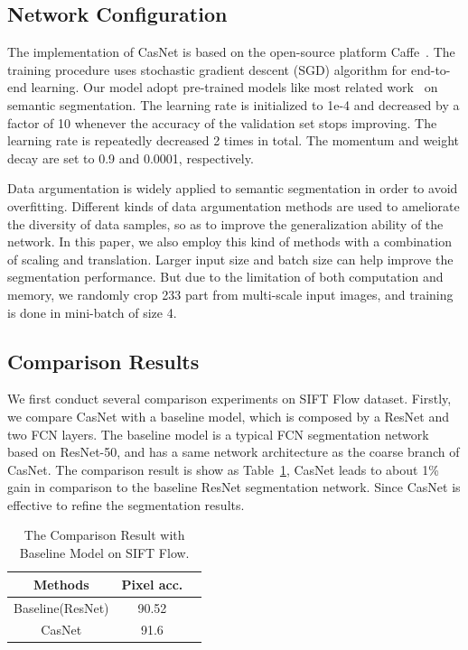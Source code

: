 \documentclass[10.5pt,compsoc]{TsT}
\newcommand{\upcite}[1]{\superscript{\textsuperscript{\cite{#1}}}}
\theoremstyle{mystyle}
\newcommand{\upcite}[1]{\textsuperscript{\cite{#1}}}
\begin{document}
{\subsection{Network Configuration}
\noindent
The implementation of CasNet is based on the open-source platform Caffe~\upcite{23}. The training procedure uses stochastic gradient descent (SGD) algorithm for end-to-end learning. Our model adopt pre-trained models like most related work~\cite{21} on semantic segmentation. The learning rate is initialized to 1e-4 and decreased by a factor of 10 whenever the accuracy of the validation set stops improving. The learning rate is repeatedly decreased 2 times in total. The momentum and weight decay are set to 0.9 and 0.0001, respectively.

Data argumentation is widely applied to semantic segmentation in order to avoid overfitting.
Different kinds of data argumentation methods are used to ameliorate the diversity of data samples, so as to improve the generalization ability of the network.
In this paper, we also employ this kind of methods with a combination of scaling and translation. 
Larger input size and batch size can help improve the segmentation performance. But due to the limitation of both computation and memory, we randomly crop 233 part from multi-scale input images, and training is done in mini-batch of size 4.



\subsection{Comparison Results}
\noindent

We first conduct several comparison experiments on SIFT Flow dataset.
Firstly, we compare CasNet with a baseline model, which is composed by a ResNet and two FCN layers. The baseline model is a  typical FCN segmentation network based on ResNet-50, and has a same network architecture as the coarse branch of CasNet. The comparison result is show as Table~\ref{t:self1}, CasNet leads to about 1\% gain in comparison to the baseline ResNet segmentation network. Since CasNet is effective to refine the segmentation results.

\begin{table}[h]
\large
\setlength{\belowcaptionskip}{12pt}
\caption{The Comparison Result with Baseline Model on SIFT Flow.}
\label{t:self1}
\centering
\begin{tabular}{ccc}
\hline 
Methods & Pixel acc. \\
\hline
Baseline(ResNet) & 90.52 \\
CasNet & 91.6  \\
\hline
\end{tabular}
\end{table}

}
\end{document}

